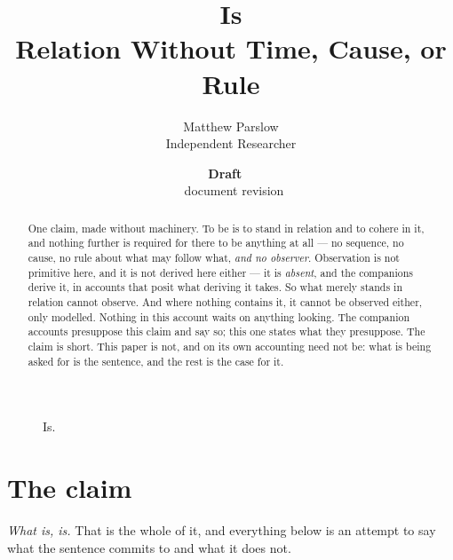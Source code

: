 \documentclass[11pt,a4paper]{article}
\title{Is\\\large Relation Without Time, Cause, or Rule}
\author{Matthew Parslow\\Independent Researcher}
\date{\textbf{Draft \texorpdfstring{\textemdash}{---}\ \PaperDraft}\\[2pt]\PaperDisplayDate \texorpdfstring{\textbullet}{\textperiodcentered}\ document revision \PaperRevision}
\theoremstyle{remark}\newtheorem{remark}[proposition]{Remark}
\begin{document}
\maketitle
\begin{center}
\end{center}
\vspace{1em}

\begin{figure}[!ht]
\centering
{}
\caption{Is.}
\label{fig:is}
\end{figure}

\begin{abstract}
One claim, made without machinery. To be is to stand in relation and to cohere in it, and nothing
further is required for there to be anything at all --- no sequence, no cause, no rule about what may
follow what, \emph{and no observer}. Observation is not primitive here, and it is not derived
here either --- it is \emph{absent}, and the companions derive it, in accounts that
posit what deriving it takes. So what merely stands in relation cannot observe. And where nothing contains it, it cannot be
observed either, only modelled. Nothing in this account waits on anything looking. The
companion accounts presuppose this claim and say so; this one states what they presuppose. The claim is short. This paper is not, and on its own accounting need not
be: what is being asked for is the sentence, and the rest is the case for it.
\end{abstract}

\section{The claim}\label{sec:claim}
\emph{What is, is.} That is the whole of it, and everything below is an attempt to say what the sentence
commits to and what it does not.
\end{document}
